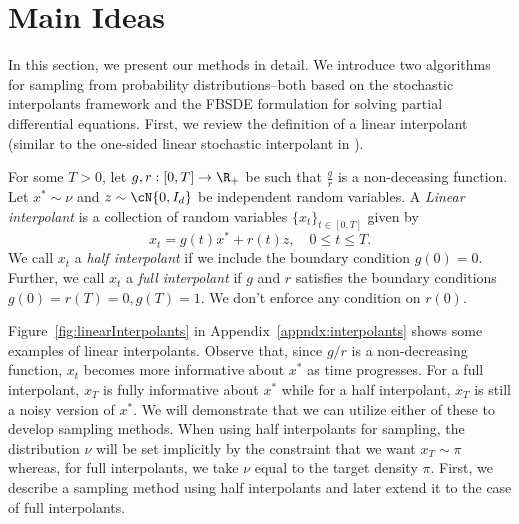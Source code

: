 \section{Main Ideas}
In this section, we present our methods in detail. We introduce two algorithms for sampling from probability distributions--both based on the stochastic interpolants framework and the FBSDE formulation for solving partial differential equations. First, we review the definition of a linear interpolant (similar to the one-sided linear stochastic interpolant in \cite{albergo_stochastic_2023}).

\begin{definition} For some $T>0$, let $g,r:[0,T]\rightarrow \R_+$ be such that $\frac{g}{r}$ is a non-deceasing function. Let $x^*\sim\nu$ and $z\sim\cN{0,I_d}$ be independent random variables. A \textit{Linear interpolant} is a collection of random variables $\{x_t\}_{t\in[0,T]}$ given by 
\begin{equation}\label{eqn:half_interpolant}
x_t = g(t)x^*+r(t)z,\quad 0\le t\le T. 
\end{equation}   
We call $x_t$ a \textit{half interpolant} if we include the boundary condition $g(0)=0$. Further, we call $x_t$ a \textit{full interpolant} if $g$ and $r$ satisfies the boundary conditions $g(0) = r(T)=0, g(T)=1$. We don't enforce any condition on $r(0)$.
\end{definition}
Figure~\ref{fig:linearInterpolants} in Appendix~\ref{appndx:interpolants} shows some examples of linear interpolants. Observe that, since $g/r$ is a non-decreasing function, $x_t$ becomes more informative about $x^*$ as time progresses. For a full interpolant, $x_T$ is fully informative about $x^*$ while for a half interpolant, $x_T$ is still a noisy version of $x^*$. We will demonstrate that we can utilize either of these to develop sampling methods. When using half interpolants for sampling, the distribution $\nu$ will be set implicitly by the constraint that we want $x_T\sim\pi$ whereas, for full interpolants, we take $\nu$ equal to the target density $\pi$. First, we describe a sampling method using half interpolants and later extend it to the case of full interpolants.
